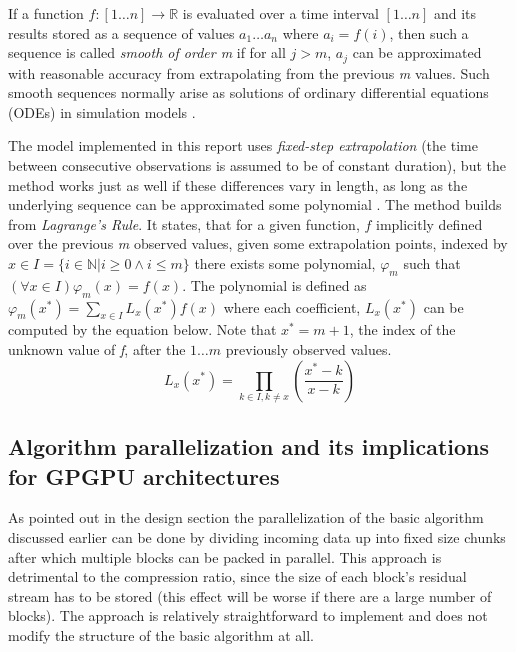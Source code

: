   If a function $f:[1\dots n] \rightarrow \mathbb{R}$ is evaluated over a time interval $[1\dots n]$ and its results stored as a sequence of values 
  $a_{1}\dots a_{n}$ where $a_{i} = f(i)$, then such a sequence is called \textit{smooth of order m} if for all $j>m$, $a_{j}$ can be approximated with reasonable
  accuracy from extrapolating from the previous \textit{m} values. Such smooth sequences normally arise as solutions of ordinary differential equations (ODEs) in
  simulation models \cite{engelson2000lossless}.
  
  The model implemented in this report uses \textit{fixed-step extrapolation} (the time between consecutive observations is assumed to be of constant duration), but
  the method works just as well if these differences vary in length, as long as the underlying sequence can be approximated some polynomial \cite{engelson2000lossless}. 
  The method builds from \textit{Lagrange's Rule}. It states, that for a given function, $f$ implicitly defined over the previous \textit{m} 
  observed values, given some extrapolation points, indexed by $x\in I = \{i\in\mathbb{N}|i\geq 0\wedge i\leq m\}$ there exists some polynomial, $\varphi_{m}$ such that 
  $(\forall x\in I) \varphi_{m}(x)=f(x)$. The polynomial is defined as $\varphi_{m}(x^{*})=\sum_{x\in I}L_{x}(x^{*})f(x)$ where each coefficient, $L_{x}(x^{*})$ 
  can be computed by the equation below. Note that $x^{*} = m + 1$, the index of the unknown value of \textit{f}, after the $1\dots m$ previously observed values.
  \begin{equation}
   L_{x}(x^{*}) = \prod_{k\in{I},k\neq x}\left(\frac{x^{*}-k}{x-k}\right)
  \end{equation}

 \subsection{Algorithm parallelization and its implications for GPGPU architectures}
  As pointed out in the design section the parallelization of the basic algorithm discussed earlier can be done by dividing incoming data up into fixed size chunks after which 
  multiple blocks can be packed in parallel. This approach is detrimental to the compression ratio, since the size of each
  block's residual stream has to be stored (this effect will be worse if there are a large number of blocks). The approach is relatively straightforward to 
  implement and does not modify the structure of the basic algorithm at all.
  
